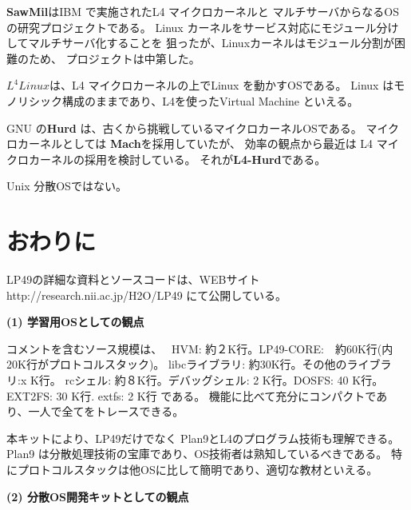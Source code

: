 \documentclass{jarticle}
\begin{document}
{\bf SawMil}はIBM で実施されたL4 マイクロカーネルと
マルチサーバからなるOS の研究プロジェクトである。
Linux カーネルをサービス対応にモジュール分けしてマルチサーバ化することを
狙ったが、Linuxカーネルはモジュール分割が困難のため、
プロジェクトは中第した。

{\bf $L^4Linux$}は、L4 マイクロカーネルの上でLinux を動かすOSである。
Linux はモノリシック構成のままであり、L4を使ったVirtual Machine といえる。

GNU の{\bf Hurd} は、古くから挑戦しているマイクロカーネルOSである。
マイクロカーネルとしては {\bf Mach}を採用していたが、
効率の観点から最近は L4 マイクロカーネルの採用を検討している。
それが{\bf L4-Hurd}である。

Unix 
分散OSではない。




\section{おわりに}


LP49の詳細な資料とソースコードは、WEBサイト 
http://research.nii.ac.jp/H2O/LP49  にて公開している。

{\bf (1) 学習用OSとしての観点}

  コメントを含むソース規模は、　
  HVM: 約２K行。LP49-CORE:　約60K行(内20K行がプロトコルスタック)。
  libcライブラリ: 約30K行。その他のライブラリ:x K行。
  rcシェル: 約８K行。デバッグシェル: 2 K行。DOSFS: 40 K行。 EXT2FS: 30 K行.
  extfs: 2 K行
である。
機能に比べて充分にコンパクトであり、一人で全てをトレースできる。

本キットにより、LP49だけでなく Plan9とL4のプログラム技術も理解できる。
Plan9 は分散処理技術の宝庫であり、OS技術者は熟知しているべきである。
特にプロトコルスタックは他OSに比して簡明であり、適切な教材といえる。

{\bf (2) 分散OS開発キットとしての観点}
\end{document}

